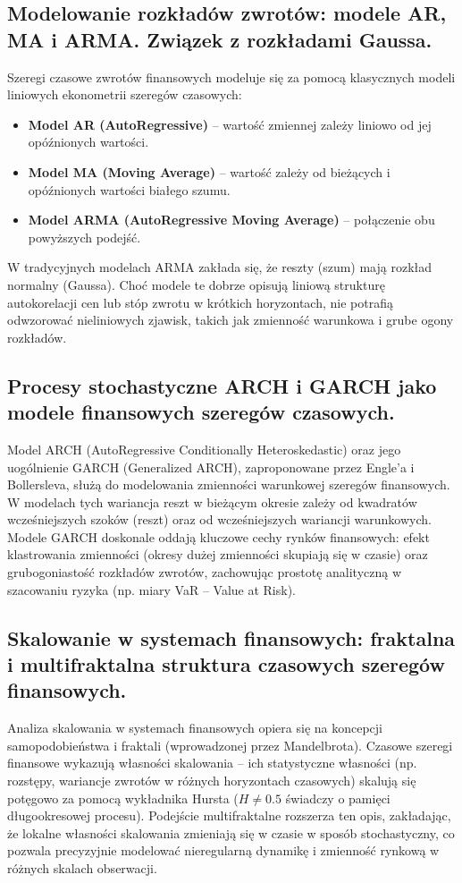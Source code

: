 \documentclass[11pt,a4paper]{article}
\begin{document}
\subsection{Modelowanie rozkładów zwrotów: modele AR, MA i ARMA. Związek z rozkładami Gaussa.}
Szeregi czasowe zwrotów finansowych modeluje się za pomocą klasycznych modeli liniowych ekonometrii szeregów czasowych:
\begin{itemize}
    \item \textbf{Model AR (AutoRegressive)} -- wartość zmiennej zależy liniowo od jej opóźnionych wartości.
    \item \textbf{Model MA (Moving Average)} -- wartość zależy od bieżących i opóźnionych wartości białego szumu.
    \item \textbf{Model ARMA (AutoRegressive Moving Average)} -- połączenie obu powyższych podejść.
\end{itemize}
W tradycyjnych modelach ARMA zakłada się, że reszty (szum) mają rozkład normalny (Gaussa). Choć modele te dobrze opisują liniową strukturę autokorelacji cen lub stóp zwrotu w krótkich horyzontach, nie potrafią odwzorować nieliniowych zjawisk, takich jak zmienność warunkowa i grube ogony rozkładów.

\subsection{Procesy stochastyczne ARCH i GARCH jako modele finansowych szeregów czasowych.}
Model ARCH (AutoRegressive Conditionally Heteroskedastic) oraz jego uogólnienie GARCH (Generalized ARCH), zaproponowane przez Engle'a i Bollersleva, służą do modelowania zmienności warunkowej szeregów finansowych. W modelach tych wariancja reszt w bieżącym okresie zależy od kwadratów wcześniejszych szoków (reszt) oraz od wcześniejszych wariancji warunkowych. Modele GARCH doskonale oddają kluczowe cechy rynków finansowych: efekt klastrowania zmienności (okresy dużej zmienności skupiają się w czasie) oraz grubogoniastość rozkładów zwrotów, zachowując prostotę analityczną w szacowaniu ryzyka (np. miary VaR -- Value at Risk).

\subsection{Skalowanie w systemach finansowych: fraktalna i multifraktalna struktura czasowych szeregów finansowych.}
Analiza skalowania w systemach finansowych opiera się na koncepcji samopodobieństwa i fraktali (wprowadzonej przez Mandelbrota). Czasowe szeregi finansowe wykazują własności skalowania -- ich statystyczne własności (np. rozstępy, wariancje zwrotów w różnych horyzontach czasowych) skalują się potęgowo za pomocą wykładnika Hursta ($H \neq 0.5$ świadczy o pamięci długookresowej procesu). Podejście multifraktalne rozszerza ten opis, zakładając, że lokalne własności skalowania zmieniają się w czasie w sposób stochastyczny, co pozwala precyzyjnie modelować nieregularną dynamikę i zmienność rynkową w różnych skalach obserwacji.
\end{document}
